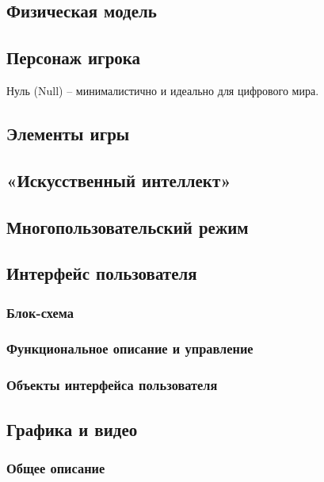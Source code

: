 \documentclass{article}
\begin{document}
\subsection{Физическая модель}

\subsection{Персонаж игрока}
Нуль (Null) – минималистично и идеально для цифрового мира.

\subsection{Элементы игры}

\subsection{«Искусственный интеллект»}

\subsection{Многопользовательский режим}

\subsection{Интерфейс пользователя}

\subsubsection{Блок-схема}

\subsubsection{Функциональное описание и управление}

\subsubsection{Объекты интерфейса пользователя}

\subsection{Графика и видео}

\subsubsection{Общее описание}
\end{document}
